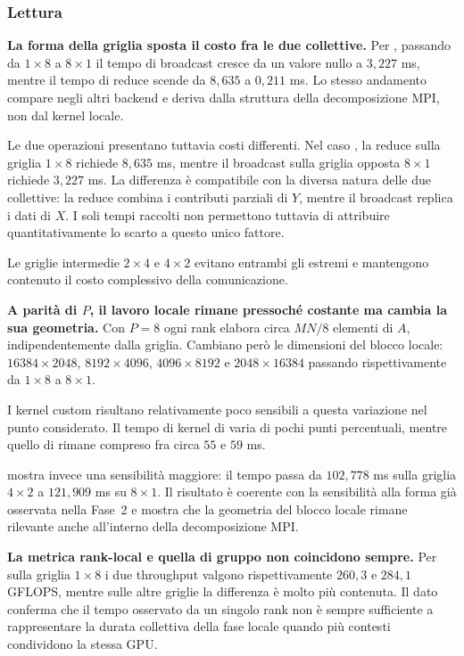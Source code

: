 \subsubsection*{Lettura}

\textbf{La forma della griglia sposta il costo fra le due collettive.}
Per , passando da $1\times8$ a $8\times1$ il tempo
di broadcast cresce da un valore nullo a $3{,}227$ ms, mentre il tempo di
reduce scende da $8{,}635$ a $0{,}211$ ms. Lo stesso andamento compare negli
altri backend e deriva dalla struttura della decomposizione MPI, non dal
kernel locale.

Le due operazioni presentano tuttavia costi differenti. Nel caso
, la reduce sulla griglia $1\times8$ richiede
$8{,}635$ ms, mentre il broadcast sulla griglia opposta $8\times1$ richiede
$3{,}227$ ms. La differenza è compatibile con la diversa natura delle due
collettive: la reduce combina i contributi parziali di $Y$, mentre il
broadcast replica i dati di $X$. I soli tempi raccolti non permettono
tuttavia di attribuire quantitativamente lo scarto a questo unico fattore.

Le griglie intermedie $2\times4$ e $4\times2$ evitano entrambi gli estremi e
mantengono contenuto il costo complessivo della comunicazione.

\textbf{A parità di $P$, il lavoro locale rimane pressoché costante ma cambia
la sua geometria.}
Con $P=8$ ogni rank elabora circa $MN/8$ elementi di $A$, indipendentemente
dalla griglia. Cambiano però le dimensioni del blocco locale:
$16384\times2048$, $8192\times4096$, $4096\times8192$ e
$2048\times16384$ passando rispettivamente da $1\times8$ a $8\times1$.

I kernel custom risultano relativamente poco sensibili a questa variazione
nel punto considerato. Il tempo di kernel di  varia
di pochi punti percentuali, mentre quello di  rimane
compreso fra circa $55$ e $59$ ms.

 mostra invece una sensibilità maggiore: il tempo passa da
$102{,}778$ ms sulla griglia $4\times2$ a $121{,}909$ ms su $8\times1$.
Il risultato è coerente con la sensibilità alla forma già osservata nella
Fase~2 e mostra che la geometria del blocco locale rimane rilevante anche
all'interno della decomposizione MPI.

\textbf{La metrica rank-local e quella di gruppo non coincidono sempre.}
Per  sulla griglia $1\times8$ i due throughput valgono
rispettivamente $260{,}3$ e $284{,}1$ GFLOPS, mentre sulle altre griglie la
differenza è molto più contenuta. Il dato conferma che il tempo osservato da
un singolo rank non è sempre sufficiente a rappresentare la durata
collettiva della fase locale quando più contesti condividono la stessa GPU.

